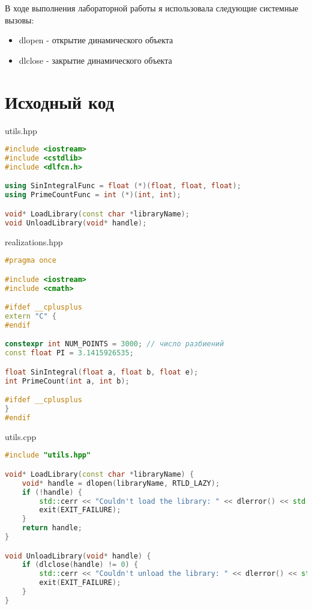 \documentclass[a4paper, 12pt]{article}
\begin{document}
В ходе выполнения лабораторной работы я использовала следующие системные вызовы:
\begin{itemize}
  \item dlopen - открытие динамического объекта
  \item dlclose - закрытие динамического объекта
\end{itemize}


\newpage

\section{Исходный код}
utils.hpp
\begin{lstlisting}[language=C++]
#include <iostream>
#include <cstdlib>
#include <dlfcn.h>

using SinIntegralFunc = float (*)(float, float, float);
using PrimeCountFunc = int (*)(int, int);

void* LoadLibrary(const char *libraryName);
void UnloadLibrary(void* handle);
\end{lstlisting}

realizations.hpp
\begin{lstlisting}[language=C++]
#pragma once

#include <iostream>
#include <cmath>

#ifdef __cplusplus
extern "C" {
#endif

constexpr int NUM_POINTS = 3000; // число разбиений
const float PI = 3.1415926535;

float SinIntegral(float a, float b, float e);
int PrimeCount(int a, int b);

#ifdef __cplusplus
}
#endif
\end{lstlisting}

utils.cpp
\begin{lstlisting}[language=C++]
#include "utils.hpp"

void* LoadLibrary(const char *libraryName) {
    void* handle = dlopen(libraryName, RTLD_LAZY);
    if (!handle) {
        std::cerr << "Couldn't load the library: " << dlerror() << std::endl;
        exit(EXIT_FAILURE);
    }
    return handle;
}

void UnloadLibrary(void* handle) {
    if (dlclose(handle) != 0) {
        std::cerr << "Couldn't unload the library: " << dlerror() << std::endl;
        exit(EXIT_FAILURE);
    }
}
\end{lstlisting}
\end{document}
